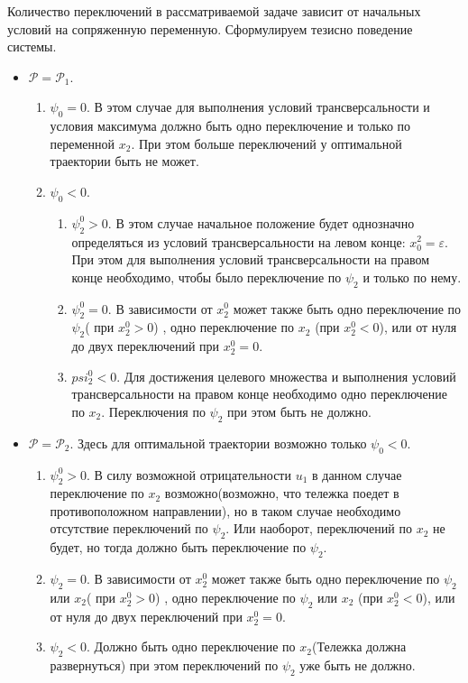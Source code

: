 \documentclass[10pt]{article}
\begin{document}
Количество переключений в рассматриваемой задаче зависит от начальных условий на сопряженную переменную. Сформулируем тезисно поведение системы.
\begin{itemize}
	\item \( \mathcal{P} = \mathcal{P}_1 \).
	\begin{enumerate}
		\item \( \psi_0 = 0 \).
		В этом случае для выполнения условий трансверсальности и условия максимума должно быть одно переключение и только по переменной \( x_2 \). При этом больше переключений у оптимальной траектории быть не может.
		\item \( \psi_0 < 0 \).
		\begin{enumerate}
			\item \(\psi_2^0 > 0 \).
			В этом случае начальное положение будет однозначно определяться из условий трансверсальности на левом конце: \( x_0^2  = \varepsilon\). При этом для выполнения условий трансверсальности на правом конце необходимо, чтобы было переключение по \( \psi_2 \) и только по нему. 
			\item \( \psi_2^0 = 0 \).
			В зависимости от \( x_2^0 \) может также быть одно переключение по \( \psi_2 \)( при \(x_2^0 > 0\)) , одно переключение по \( x_2 \) (при \(x_2^0 < 0\)), или от нуля до двух переключений при \( x_2^0 = 0 \).
			\item \( psi_2^0 < 0 \).
			Для достижения целевого множества и выполнения условий трансверсальности на правом конце необходимо одно переключение по \( x_2 \). Переключения по \( \psi_2 \) при этом быть не должно.
		\end{enumerate}
	\end{enumerate}
	\item \( \mathcal{P} = \mathcal{P}_2 \).
	Здесь для оптимальной траектории возможно только \( \psi_0 < 0 \). 
	\begin{enumerate}
		\item \( \psi_2^0 > 0 \).
		В силу возможной отрицательности \( u_1 \) в данном случае переключение по \( x_2 \) возможно(возможно, что тележка поедет в противоположном направлении), но в таком случае необходимо отсутствие переключений по \( \psi_2 \). Или наоборот, переключений по \( x_2 \) не будет, но тогда должно быть переключение по \( \psi_2 \).
		\item \( \psi_2 = 0 \).
		В зависимости от \( x_2^0 \) может также быть одно переключение по \( \psi_2 \) или \( x_2 \)( при \(x_2^0 > 0\)) , одно переключение по \( \psi_2 \) или \( x_2 \) (при \(x_2^0 < 0\)), или от нуля до двух переключений при \( x_2^0 = 0 \).
		\item \( \psi_2 < 0 \).
		Должно быть одно переключение по \( x_2 \)(Тележка должна развернуться) при этом переключений по \( \psi_2 \) уже быть не должно.
	\end{enumerate}
\end{itemize}
\end{document}
